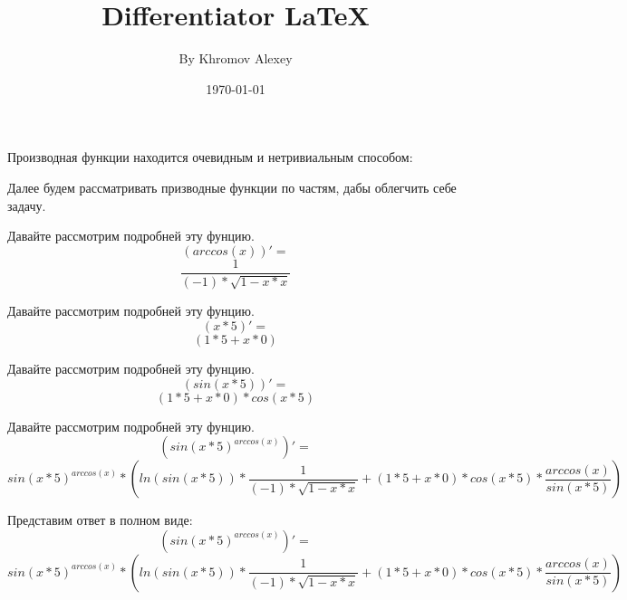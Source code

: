 \documentclass[a4paper,12pt]{article}
\author{By Khromov Alexey}
\title{Differentiator \LaTeX{}}
\date{\today}
\begin{document}
\maketitle
\newpage
Производная функции находится очевидным и нетривиальным способом:

Далее будем рассматривать призводные функции по частям, дабы облегчить себе задачу.

Давайте рассмотрим подробней эту фунцию.
\begin{equation}
\left( arccos \left( {x }\right) \right)' =
\end{equation}
\begin{equation}
\frac{{1 }}{{{\left( -1 \right) }* {\sqrt {{{1 }- {{x }* {x }}}} }}}
\end{equation}

Давайте рассмотрим подробней эту фунцию.
\begin{equation}
\left( {x }* {5 }\right)' =
\end{equation}
\begin{equation}
\left( {{1 }* {5 }}+ {{x }* {0 }}\right) 
\end{equation}

Давайте рассмотрим подробней эту фунцию.
\begin{equation}
\left( sin \left( {{x }* {5 }}\right) \right)' =
\end{equation}
\begin{equation}
{\left( {{1 }* {5 }}+ {{x }* {0 }}\right) }* {cos \left( {{x }* {5 }}\right) }
\end{equation}

Давайте рассмотрим подробней эту фунцию.
\begin{equation}
\left( {sin \left( {{x }* {5 }}\right) }^ {arccos \left( {x }\right) }\right)' =
\end{equation}
\begin{equation}
{{sin \left( {{x }* {5 }}\right) }^ {arccos \left( {x }\right) }}* {\left( {{ln \left( {sin \left( {{x }* {5 }}\right) }\right) }* {\frac{{1 }}{{{\left( -1 \right) }* {\sqrt {{{1 }- {{x }* {x }}}} }}}}}+ {{{\left( {{1 }* {5 }}+ {{x }* {0 }}\right) }* {cos \left( {{x }* {5 }}\right) }}* {\frac{{arccos \left( {x }\right) }}{{sin \left( {{x }* {5 }}\right) }}}}\right) }
\end{equation}

Представим ответ в полном виде:
\begin{equation}
\left( {sin \left( {{x }* {5 }}\right) }^ {arccos \left( {x }\right) }\right)' =
\end{equation}
\begin{equation}
{{sin \left( {{x }* {5 }}\right) }^ {arccos \left( {x }\right) }}* {\left( {{ln \left( {sin \left( {{x }* {5 }}\right) }\right) }* {\frac{{1 }}{{{\left( -1 \right) }* {\sqrt {{{1 }- {{x }* {x }}}} }}}}}+ {{{\left( {{1 }* {5 }}+ {{x }* {0 }}\right) }* {cos \left( {{x }* {5 }}\right) }}* {\frac{{arccos \left( {x }\right) }}{{sin \left( {{x }* {5 }}\right) }}}}\right) }
\end{equation}
\end{document}
